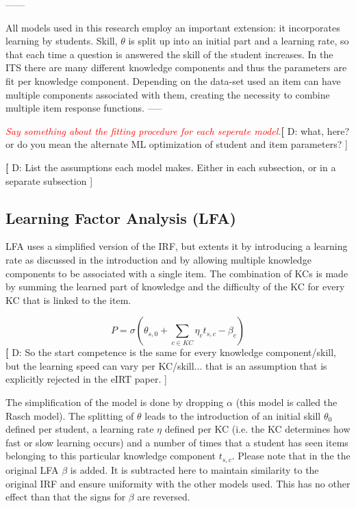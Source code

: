 \documentclass{scrartcl}
\newcommand\todo[1]{\textit{\textcolor{red}{#1}}}
\providecommand{\comm}[1]{{\textbf[ #1 ]}}
\providecommand{\commd}[1]{\comm{D: {#1}}}
\begin{document}
------

All models used in this research employ an important extension: it incorporates learning by students. Skill, $\theta$ is split up into an initial part and a learning rate, so that each time a question is answered the skill of the student increases. In the ITS there are many different knowledge components and thus the parameters are fit per knowledge component. Depending on the data-set used an item can have multiple components associated with them, creating the necessity to combine multiple item response functions.
-----


\todo{Say something about the fitting procedure for each seperate model.}\commd{what, here? or do you mean the alternate ML optimization of student and item parameters? }

\commd{List the assumptions each model makes. Either in each subsection, or in a separate subsection}

\subsection{Learning Factor Analysis (LFA)}
\label{sec:LFA}


LFA uses a simplified version of the IRF, but extents it by introducing a learning rate as discussed in the introduction and by allowing multiple knowledge components to be associated with a single item. The combination of KCs is made by summing the learned part of knowledge and the difficulty of the KC for every KC that is linked to the item.

\begin{equation}
\label{eq:afm}
P = \sigma(\theta_{s,0} + \sum_{c \in KC}  \eta_{c} t_{s,c} - \beta_{c})
\end{equation}
\commd{So the start competence is the same for every knowledge component/skill, but the learning speed can vary per KC/skill... that is an assumption that is explicitly rejected in the eIRT paper.}

The simplification of the model is done by dropping $\alpha$ (this model is called the Rasch model). The splitting of $\theta$ leads to the introduction of an initial skill $\theta_{0}$ defined per student, a learning rate $\eta$ defined per KC (i.e. the KC determines how fast or slow learning occurs) and a number of times that a student has seen items belonging to this particular knowledge component $t_{s,c}$. Please note that in the the original LFA $\beta$ is added. It is subtracted here to maintain similarity to the original IRF and ensure uniformity with the other models used. This has no other effect than that the signs for $\beta$ are reversed.
\end{document}
